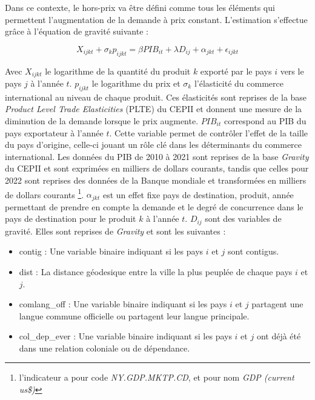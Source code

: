 \documentclass[french,10pt,a4paper]{article}
\begin{document}
Dans ce contexte, le hors-prix va être défini comme tous les éléments qui permettent l'augmentation de la demande à prix constant. L'estimation s'effectue grâce à l'équation de gravité suivante :

\begin{equation}
\label{eq:2}
X_{ijkt} + \sigma_{k} p_{ijkt}  = \beta PIB_{it} + \lambda D_{ij} + \alpha_{jkt} + \epsilon_{ijkt}
\end{equation}

Avec $X_{ijkt}$ le logarithme de la quantité du produit $k$ exporté par le pays $i$ vers le pays $j$ à l'année $t$. $p_{ijkt}$ le logarithme du prix et $\sigma_{k}$ l'élasticité du commerce international au niveau de chaque produit. Ces élasticités sont reprises de la base \textit{Product Level Trade Elasticities} (PLTE) du CEPII \citep{Fontagne2019} et donnent une mesure de la diminution de la demande lorsque le prix augmente. $PIB_{it}$ correspond au PIB du pays exportateur à l'année $t$. Cette variable permet de contrôler l'effet de la taille du pays d'origine, celle-ci jouant un rôle clé dans les déterminants du commerce international. Les données du PIB de 2010 à 2021 sont reprises de la base \textit{Gravity} du CEPII \citep{Conte2022} et sont exprimées en milliers de dollars courants, tandis que celles pour 2022 sont reprises des données de la Banque mondiale et transformées en milliers de dollars courants \footnote{l'indicateur a pour code \textit{NY.GDP.MKTP.CD}, et pour nom \textit{GDP (current us\$)}}. $\alpha_{jkt}$ est un effet fixe pays de destination, produit, année permettant de prendre en compte la demande et le degré de concurrence dans le pays de destination pour le produit $k$ à l'année $t$. $D_{ij}$ sont des variables de gravité. Elles sont reprises de \textit{Gravity} et sont les suivantes :

\begin{itemize}
  \item contig : Une variable binaire indiquant si les pays $i$ et $j$ sont contigus.
  \item dist : La distance géodesique entre la ville la plus peuplée de chaque pays $i$ et $j$.
  \item comlang\_off : Une variable binaire indiquant si les pays $i$ et $j$ partagent une langue commune officielle ou partagent leur langue principale. 
  \item col\_dep\_ever : Une variable binaire indiquant si les pays $i$ et $j$ ont déjà été dans une relation coloniale ou de dépendance. 
\end{itemize}
\end{document}
